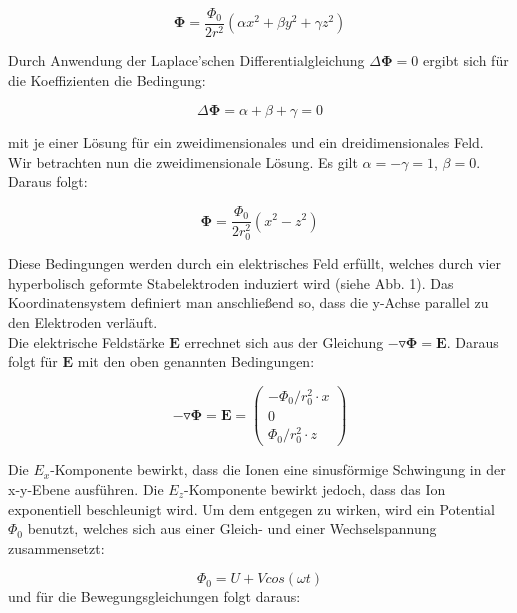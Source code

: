 \begin{equation}
\mathbf{\Phi} = \frac{\Phi_{0}}{2r^{2}}\left(\alpha x^{2}+\beta y^{2}+\gamma z^{2}\right)
\end{equation}

Durch Anwendung der Laplace'schen Differentialgleichung $\Delta \mathbf{\Phi} =0$ ergibt sich für die Koeffizienten die Bedingung:

\begin{equation}
\Delta \mathbf{\Phi} = \alpha + \beta +\gamma =0
\end{equation}

mit je einer Lösung für ein zweidimensionales und ein dreidimensionales Feld.\\
Wir betrachten nun die zweidimensionale Lösung. Es gilt $\alpha = -\gamma = 1$, $\beta =0$. Daraus folgt:

\begin{equation}
\mathbf{\Phi} = \frac{\Phi_{0}}{2r_{0}^{2}}\left(x^{2}-z^{2}\right)
\end{equation}

Diese Bedingungen werden durch ein elektrisches Feld erfüllt, welches durch vier hyperbolisch geformte Stabelektroden induziert wird (siehe Abb. 1). Das Koordinatensystem definiert man anschließend so, dass die y-Achse parallel zu den Elektroden verläuft.
\\
Die elektrische Feldstärke $\mathbf{E}$ errechnet sich aus der Gleichung $-\mathbf{\triangledown \Phi} = \mathbf{E}$. Daraus folgt für $\mathbf{E}$ mit den oben genannten Bedingungen:

\begin{equation}
-\mathbf{\triangledown \Phi} = \mathbf{E} =
\left(
\begin{matrix}
-\Phi_{0}/r_{0}^{2} \cdot x\\
0\\
\Phi_{0}/r_{0}^{2} \cdot z
\end{matrix}
\right)
\end{equation}

Die $E_x$-Komponente bewirkt, dass die Ionen eine sinusförmige Schwingung in der x-y-Ebene ausführen. Die $E_z$-Komponente bewirkt jedoch, dass das Ion exponentiell beschleunigt wird. Um dem entgegen zu wirken, wird ein Potential $\Phi_0$ benutzt, welches sich aus einer Gleich- und einer Wechselspannung zusammensetzt: 

\begin{equation}
\Phi_{0}=U + V cos(\omega t)
\end{equation}
\newpage
und für die Bewegungsgleichungen folgt daraus:

